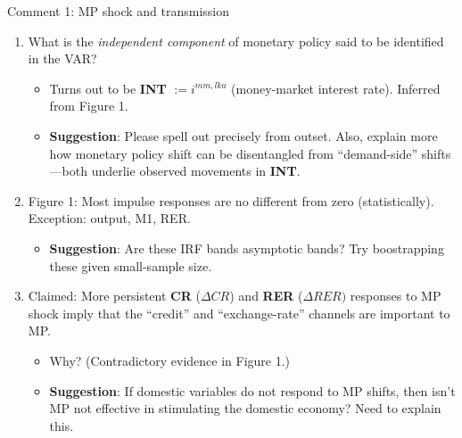 \documentclass[10pt,english,slidetop,compress,
              blue,mathserif,color=option]{beamer}
\theoremstyle{plain}
\theoremstyle{definition}
\begin{document}
\begin{frame}{Comment 1: MP shock and transmission}

  \begin{enumerate}
    \item What is the \emph{independent component} of monetary policy said to be identified in the VAR?
      \begin{itemize}
        \item Turns out to be \textbf{INT} $:= i^{mm,lka}$ (money-market interest rate). Inferred from Figure 1. 
        \item \textbf{Suggestion}: Please spell out precisely from outset. Also, explain more how monetary policy shift can be disentangled from ``demand-side'' shifts---both underlie observed movements in \textbf{INT}.
      \end{itemize}

      \bigskip

    \item Figure 1: Most impulse responses are no different from zero (statistically). Exception: output, M1, RER. 
      \begin{itemize}  
        \item \textbf{Suggestion}: Are these IRF bands asymptotic bands? Try boostrapping these given small-sample size.
      \end{itemize}

      \bigskip

    \item Claimed: More persistent \textbf{CR} ($\Delta CR$) and \textbf{RER} ($\Delta RER)$ responses to MP shock imply that the ``credit'' and ``exchange-rate'' channels are important to MP. 
      \begin{itemize}  
        \item Why? (Contradictory evidence in Figure 1.)
        \item \textbf{Suggestion}: If domestic variables do not respond to MP shifts, then isn't MP not effective in stimulating the domestic economy? Need to explain this.
      \end{itemize}
  \end{enumerate}

\end{frame}
\end{document}
